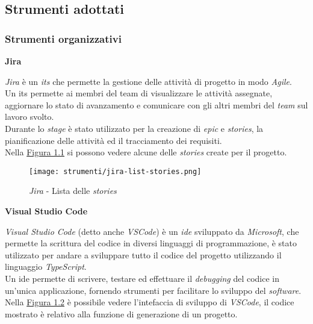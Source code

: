 \pagebreak
\subsection{Strumenti adottati}
\label{sez:strumenti-adottati}

\subsubsection{Strumenti organizzativi}
\label{sez:strumenti-organizzativi}

\noindent \textbf{Jira\\}

\noindent \textit{Jira} è un \textit{\gls{its}} che permette la gestione delle attività di progetto in modo \textit{Agile}.\\
Un \gls{its} permette ai membri del team di visualizzare le attività assegnate, aggiornare lo stato di avanzamento e comunicare con gli altri membri del \textit{team} sul lavoro svolto. \\
Durante lo \textit{stage} è stato utilizzato per la creazione di \textit{epic} e \textit{stories}, la pianificazione delle attività ed il tracciamento dei requisiti. \\
Nella {\hyperref[fig:jira-list-stories]{Figura 1.1}} si possono vedere alcune delle \textit{stories} create per il progetto.
\begin{figure}[H]
    \label{fig:jira-list-stories}
    \centering
    \texttt{[image: strumenti/jira-list-stories.png]}
    \caption{\textit{Jira} - Lista delle \textit{stories}}
\end{figure}


\noindent \textbf{Visual Studio Code\\}

\noindent \textit{Visual Studio Code} (detto anche \textit{VSCode}) è un \textit{\gls{ide}} sviluppato da \textit{Microsoft}, che permette la scrittura del codice in diversi linguaggi di programmazione, è stato utilizzato per andare
a sviluppare tutto il codice del progetto utilizzando il linguaggio \textit{TypeScript}.\\
Un \gls{ide} permette di scrivere, testare ed effettuare il \textit{debugging} del codice in un'unica applicazione, fornendo strumenti per facilitare lo sviluppo del \textit{software}.\\
Nella {\hyperref[fig:vscode]{Figura 1.2}} è possibile vedere l'intefaccia di sviluppo di \textit{VSCode}, il codice mostrato è relativo alla funzione di generazione di un progetto.

